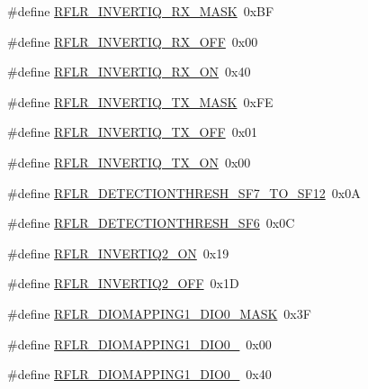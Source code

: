 \begin{DoxyCompactItemize}
\#define \mbox{\hyperlink{sx1276_regs-_lo_ra_8h_acd90b646213ae78994111ee2653940b1}{R\+F\+L\+R\+\_\+\+I\+N\+V\+E\+R\+T\+I\+Q\+\_\+\+R\+X\+\_\+\+M\+A\+SK}}~0x\+BF
\item 
\#define \mbox{\hyperlink{sx1276_regs-_lo_ra_8h_a9c9c9827af6cdbca76caa24df62ccc8e}{R\+F\+L\+R\+\_\+\+I\+N\+V\+E\+R\+T\+I\+Q\+\_\+\+R\+X\+\_\+\+O\+FF}}~0x00
\item 
\#define \mbox{\hyperlink{sx1276_regs-_lo_ra_8h_a2dfdb9bc15c1adca8287a01803ed2672}{R\+F\+L\+R\+\_\+\+I\+N\+V\+E\+R\+T\+I\+Q\+\_\+\+R\+X\+\_\+\+ON}}~0x40
\item 
\#define \mbox{\hyperlink{sx1276_regs-_lo_ra_8h_a105fb2d297f6c79929c49e9af746abe6}{R\+F\+L\+R\+\_\+\+I\+N\+V\+E\+R\+T\+I\+Q\+\_\+\+T\+X\+\_\+\+M\+A\+SK}}~0x\+FE
\item 
\#define \mbox{\hyperlink{sx1276_regs-_lo_ra_8h_a0a85cfee5ae010b871c747d507065d14}{R\+F\+L\+R\+\_\+\+I\+N\+V\+E\+R\+T\+I\+Q\+\_\+\+T\+X\+\_\+\+O\+FF}}~0x01
\item 
\#define \mbox{\hyperlink{sx1276_regs-_lo_ra_8h_aee577d02af06b8226f3e880bd0e06e0c}{R\+F\+L\+R\+\_\+\+I\+N\+V\+E\+R\+T\+I\+Q\+\_\+\+T\+X\+\_\+\+ON}}~0x00
\item 
\#define \mbox{\hyperlink{sx1276_regs-_lo_ra_8h_a0b071b81b299c33f0dc61036cb00b5c8}{R\+F\+L\+R\+\_\+\+D\+E\+T\+E\+C\+T\+I\+O\+N\+T\+H\+R\+E\+S\+H\+\_\+\+S\+F7\+\_\+\+T\+O\+\_\+\+S\+F12}}~0x0A
\item 
\#define \mbox{\hyperlink{sx1276_regs-_lo_ra_8h_a8833cf246a93bf07dca0b0c60fb31eef}{R\+F\+L\+R\+\_\+\+D\+E\+T\+E\+C\+T\+I\+O\+N\+T\+H\+R\+E\+S\+H\+\_\+\+S\+F6}}~0x0C
\item 
\#define \mbox{\hyperlink{sx1276_regs-_lo_ra_8h_a9eb231f472e12e3a0f4ee8b9dd2586b7}{R\+F\+L\+R\+\_\+\+I\+N\+V\+E\+R\+T\+I\+Q2\+\_\+\+ON}}~0x19
\item 
\#define \mbox{\hyperlink{sx1276_regs-_lo_ra_8h_aebe752d4de9fd54dac7d4be3ce195b16}{R\+F\+L\+R\+\_\+\+I\+N\+V\+E\+R\+T\+I\+Q2\+\_\+\+O\+FF}}~0x1D
\item 
\#define \mbox{\hyperlink{sx1276_regs-_lo_ra_8h_af758e474cda2159002abe0e6180d7cd1}{R\+F\+L\+R\+\_\+\+D\+I\+O\+M\+A\+P\+P\+I\+N\+G1\+\_\+\+D\+I\+O0\+\_\+\+M\+A\+SK}}~0x3F
\item 
\#define \mbox{\hyperlink{sx1276_regs-_lo_ra_8h_ab6265039b78b19a1a30b1219633cd48b}{R\+F\+L\+R\+\_\+\+D\+I\+O\+M\+A\+P\+P\+I\+N\+G1\+\_\+\+D\+I\+O0\+\_}}~0x00
\item 
\#define \mbox{\hyperlink{sx1276_regs-_lo_ra_8h_a045b2ea3634a643b2b3c924dc7eba8ed}{R\+F\+L\+R\+\_\+\+D\+I\+O\+M\+A\+P\+P\+I\+N\+G1\+\_\+\+D\+I\+O0\+\_}}~0x40

\end{DoxyCompactItemize}
